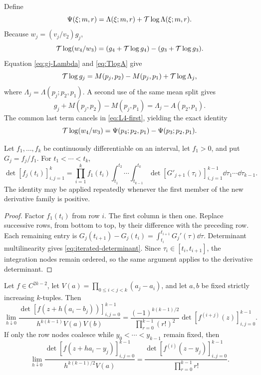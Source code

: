 Define
\[
 \Psi(\xi;m,r)=\Lambda(\xi;m,r)+\mathcal{T}\log\Lambda(\xi;m,r).
\]
Because \(w_j=(v_j/v_2)g_j\),
\begin{equation}\label{eq:L4-first}
 \mathcal{T}\log(w_4/w_3)
 =(g_4+\mathcal{T}\log g_4)-(g_3+\mathcal{T}\log g_3).
\end{equation}
Equation \eqref{eq:gj-Lambda} and \eqref{eq:TlogA} give
\[
 \mathcal{T}\log g_j=M(p_j,p_2)-M(p_j,p_1)+\mathcal{T}\log\Lambda_j,
\]
where \(\Lambda_j=\Lambda(p_j;p_2,p_1)\). A second use of the same mean split
gives
\[
 g_j+M(p_j,p_2)-M(p_j,p_1)=\Lambda_j-A(p_2,p_1).
\]
The common last term cancels in \eqref{eq:L4-first}, yielding the exact
identity
\begin{equation}\label{eq:L4-Psi}
 \mathcal{T}\log(w_4/w_3)
 =\Psi(p_4;p_2,p_1)-\Psi(p_3;p_2,p_1).
\end{equation}

\begin{lemma}\label{lem:quotient-integral}
Let \(f_1,\ldots,f_k\) be continuously differentiable on an interval,
let \(f_1>0\), and put \(G_j=f_j/f_1\). For
\(t_1<\cdots<t_k\),
\begin{equation}\label{eq:iterated-determinant}
 \det[f_j(t_i)]_{i,j=1}^k
 =\prod_{i=1}^k f_1(t_i)
 \int_{t_1}^{t_2}\!\cdots\!\int_{t_{k-1}}^{t_k}
 \det[G'_{j+1}(\tau_i)]_{i,j=1}^{k-1}
 \dd\tau_1\cdots\dd\tau_{k-1}.
\end{equation}
The identity may be applied repeatedly whenever the first member of the new
derivative family is positive.
\end{lemma}

\begin{proof}
Factor \(f_1(t_i)\) from row \(i\). The first column is then one. Replace
successive rows, from bottom to top, by their difference with the preceding
row. Each remaining entry is
\(G_j(t_{i+1})-G_j(t_i)=\int_{t_i}^{t_{i+1}}G_j'(\tau)\dd\tau\).
Determinant multilinearity gives \eqref{eq:iterated-determinant}. Since
\(\tau_i\in[t_i,t_{i+1}]\), the integration nodes remain ordered, so the same
argument applies to the derivative determinant.
\end{proof}

\begin{lemma}\label{lem:confluent-limit}
Let \(f\in C^{2k-2}\), let
\(V(a)=\prod_{0\leq i<j<k}(a_j-a_i)\), and let \(a,b\) be fixed strictly
increasing \(k\)-tuples. Then
\begin{equation}\label{eq:two-sided-confluence}
 \lim_{h\downarrow0}
 \frac{\det[f(z+h(a_i-b_j))]_{i,j=0}^{k-1}}
 {h^{k(k-1)}V(a)V(b)}
 =\frac{(-1)^{k(k-1)/2}}
 {\prod_{r=0}^{k-1}(r!)^2}
 \det[f^{(i+j)}(z)]_{i,j=0}^{k-1}.
\end{equation}
If only the row nodes coalesce while \(y_0<\cdots<y_{k-1}\) remain fixed,
then
\begin{equation}\label{eq:one-sided-confluence}
 \lim_{h\downarrow0}
 \frac{\det[f(z+ha_i-y_j)]_{i,j=0}^{k-1}}
 {h^{k(k-1)/2}V(a)}
 =\frac{\det[f^{(i)}(z-y_j)]_{i,j=0}^{k-1}}
 {\prod_{r=0}^{k-1}r!}.
\end{equation}
\end{lemma}

